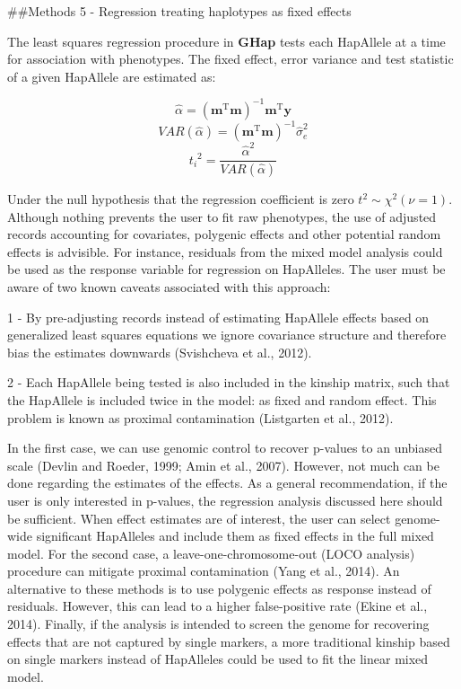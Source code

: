 \documentclass[
]{article}
\begin{document}
\pagebreak

\#\#Methods 5 - Regression treating haplotypes as fixed effects

The least squares regression procedure in \textbf{GHap} tests each
HapAllele at a time for association with phenotypes. The fixed effect,
error variance and test statistic of a given HapAllele are estimated as:

\[\hat{\alpha} = (\mathbf{m}^\text{T}\mathbf{m})^{-1}\mathbf{m}^\text{T}\mathbf{y}\]
\[VAR(\hat{\alpha}) = (\mathbf{m}^\text{T}\mathbf{m})^{-1}\hat{\sigma}_e^2\]
\[{t_i}^{2} = \frac{\hat{\alpha}^2}{VAR(\hat{\alpha})}\]

Under the null hypothesis that the regression coefficient is zero
\(t^2 \sim \chi^2(\nu = 1)\). Although nothing prevents the user to fit
raw phenotypes, the use of adjusted records accounting for covariates,
polygenic effects and other potential random effects is advisible. For
instance, residuals from the mixed model analysis could be used as the
response variable for regression on HapAlleles. The user must be aware
of two known caveats associated with this approach:

1 - By pre-adjusting records instead of estimating HapAllele effects
based on generalized least squares equations we ignore covariance
structure and therefore bias the estimates downwards (Svishcheva et al.,
2012).

2 - Each HapAllele being tested is also included in the kinship matrix,
such that the HapAllele is included twice in the model: as fixed and
random effect. This problem is known as proximal contamination
(Listgarten et al., 2012).

In the first case, we can use genomic control to recover p-values to an
unbiased scale (Devlin and Roeder, 1999; Amin et al., 2007). However,
not much can be done regarding the estimates of the effects. As a
general recommendation, if the user is only interested in p-values, the
regression analysis discussed here should be sufficient. When effect
estimates are of interest, the user can select genome-wide significant
HapAlleles and include them as fixed effects in the full mixed model.
For the second case, a leave-one-chromosome-out (LOCO analysis)
procedure can mitigate proximal contamination (Yang et al., 2014). An
alternative to these methods is to use polygenic effects as response
instead of residuals. However, this can lead to a higher false-positive
rate (Ekine et al., 2014). Finally, if the analysis is intended to
screen the genome for recovering effects that are not captured by single
markers, a more traditional kinship based on single markers instead of
HapAlleles could be used to fit the linear mixed model.
\end{document}
